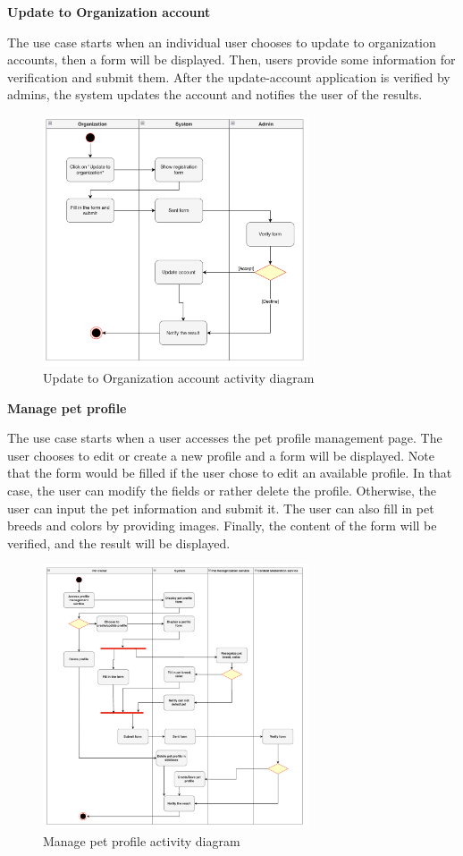 \textbf{Update to Organization account}

The use case starts when an individual user chooses to update to organization accounts, then a form will be displayed. Then, users provide some information for verification and submit them. After the update-account application is verified by admins, the system updates the account and notifies the user of the results.

\begin{figure}[H]
  \centering
  \includegraphics[width=0.7\textwidth]{Figures/update_org.png}
  \caption{Update to Organization account activity diagram}
  \label{fig:update-org}
\end{figure}

\textbf{Manage pet profile}

The use case starts when a user accesses the pet profile management page. The user chooses to edit or create a new profile and a form will be displayed. Note that the form would be filled if the user chose to edit an available profile. In that case, the user can modify the fields or rather delete the profile. Otherwise, the user can input the pet information and submit it. The user can also fill in pet breeds and colors by providing images. Finally, the content of the form will be verified, and the result will be displayed.

\begin{figure}[H]
  \centering
  \includegraphics[width=0.7\textwidth]{Figures/manage_pet.png}
  \caption{Manage pet profile activity diagram}
  \label{fig:manage-pet}
\end{figure}


